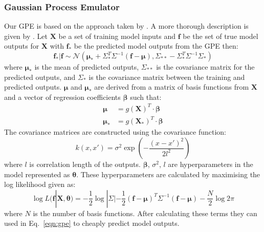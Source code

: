\documentclass[12pt,a4paper]{article}
\begin{document}
\subsubsection{Gaussian Process Emulator}
\noindent
Our GPE is based on the approach taken by . A more thorough description is given by . Let $\bm{X}$ be a set of training model inputs and $\bm{f}$ be the set of true model outputs for $\bm{X}$ with $\bm{f}_*$ be the predicted model outputs from the GPE then:
\begin{equation}\label{eqn:gpe}
	\bm{f_*}|\bm{f}\sim \mathcal{N}(\bm{\mu}_* + \Sigma_*^T\Sigma^{-1}(\bm{f}-\bm{\mu}),
	\Sigma_{**}-\Sigma_*^T\Sigma^{-1}\Sigma_*)
\end{equation}
where $\bm{\mu}_*$ is the mean of predicted outputs, $\Sigma_{**}$ is the covariance matrix for the predicted outputs, and $\Sigma_*$ is the covariance matrix between the training and predicted outputs. $\bm{\mu}$ and $\bm{\mu}_*$ are derived from a matrix of basis functions from $\bm{X}$ and a vector of regression coefficients $\bm{\beta}$ such that:
\begin{align}\label{eqn:mew}
	\bm{\mu} &= g(\bm{X})^T\cdot \bm{\beta} \\
	\bm{\mu}_* &= g(\bm{X}_*)^T\cdot \bm{\beta}
\end{align}
The covariance matrices are constructed using the covariance function:
\begin{equation}
	k(x,x')=\sigma^2\exp\left( -\frac{(x-x')^2}{2l^2}\right)
\end{equation}
where $l$ is correlation length of the outputs. $\bm{\beta}$, $\sigma^2$, $l$ are hyperparameters in the model represented as $\bm{\theta}$. These hyperparameters are calculated by maximising the log likelihood given as:
\begin{equation}
	\log L(\bm{f}|\bm{X},\bm{\theta})=-\frac{1}{2}\log|\Sigma|-\frac{1}{2}(\bm{f}-\bm{\mu})^T
	\Sigma^{-1}(\bm{f}-\bm{\mu})-\frac{N}{2}\log2\pi
\end{equation}
where $N$ is the number of basis functions. After calculating these terms they can used in Eq.~\eqref{eqn:gpe} to cheaply predict model outputs.
\end{document}
